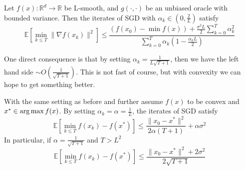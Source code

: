 \begin{theorem}
    Let $f(x) : \mathbb{R}^d \rightarrow \mathbb{R}$ be L-smooth, and $g(\cdot, \cdot)$ be an unbiased oracle with bounded variance. Then the iterates of SGD with $\alpha_k \in (0, \frac{2}{L})$ satisfy
    \begin{equation*}
        \mathbb{E}[\min_{k \leq T} \|\nabla f(x_k)\|^2] \leq \frac{(f(x_0) - \min f(x)) + \frac{\sigma^2L}{2}\sum_{k=0}^{T}\alpha_k^2}{\sum_{k=0}^{T}\alpha_k(1 - \frac{\alpha_k L }{2})}
    \end{equation*}
\end{theorem}

One direct consequence is that by setting $\alpha_k = \frac{1}{L\sqrt{T+1}}$, then we have the left hand side $\sim O(\frac{1}{\sqrt{T+1}})$. This is not fast of course, but with convexity we can hope to get something better. 
\begin{theorem}
    With the same setting as before and further assume $f(x)$ to be convex and $x^* \in \operatorname*{arg\,max} f(x)$. By setting $\alpha_k = \alpha = \frac{1}{L}$, the iterates of SGD satisfy
    \begin{equation*}
        \mathbb{E}[\min_{k \leq T} f(x_k) - f(x^*)] \leq \frac{\|x_0 - x^*\|^2}{2\alpha(T+1)} + \alpha\sigma^2
    \end{equation*}
    In particular, if $\alpha = \frac{1}{\sqrt{T+1}}$ and $T > L^2$
    \begin{equation*}
        \mathbb{E}[\min_{k \leq T}f(x_k) - f(x^*)] \leq \frac{\|x_0 - x^*\|^2 + 2\sigma^2}{2\sqrt{T+1}}
    \end{equation*}
\end{theorem}